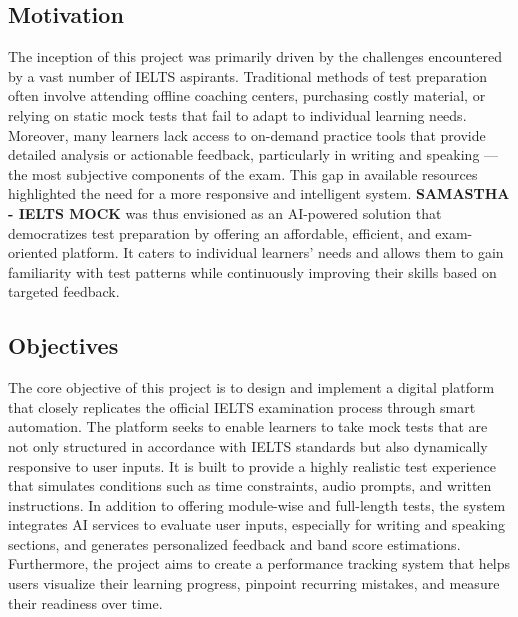 \documentclass[a4paper,12pt]{article}
\begin{document}
\vspace{0.5cm}

\subsection{Motivation}

The inception of this project was primarily driven by the challenges encountered by a vast number of IELTS aspirants. Traditional methods of test preparation often involve attending offline coaching centers, purchasing costly material, or relying on static mock tests that fail to adapt to individual learning needs. Moreover, many learners lack access to on-demand practice tools that provide detailed analysis or actionable feedback, particularly in writing and speaking — the most subjective components of the exam. This gap in available resources highlighted the need for a more responsive and intelligent system. \textbf{SAMASTHA - IELTS MOCK} was thus envisioned as an AI-powered solution that democratizes test preparation by offering an affordable, efficient, and exam-oriented platform. It caters to individual learners' needs and allows them to gain familiarity with test patterns while continuously improving their skills based on targeted feedback.

\vspace{0.5cm}

\subsection{Objectives}

The core objective of this project is to design and implement a digital platform that closely replicates the official IELTS examination process through smart automation. The platform seeks to enable learners to take mock tests that are not only structured in accordance with IELTS standards but also dynamically responsive to user inputs. It is built to provide a highly realistic test experience that simulates conditions such as time constraints, audio prompts, and written instructions. In addition to offering module-wise and full-length tests, the system integrates AI services to evaluate user inputs, especially for writing and speaking sections, and generates personalized feedback and band score estimations. Furthermore, the project aims to create a performance tracking system that helps users visualize their learning progress, pinpoint recurring mistakes, and measure their readiness over time.

\vspace{0.5cm}
\end{document}
